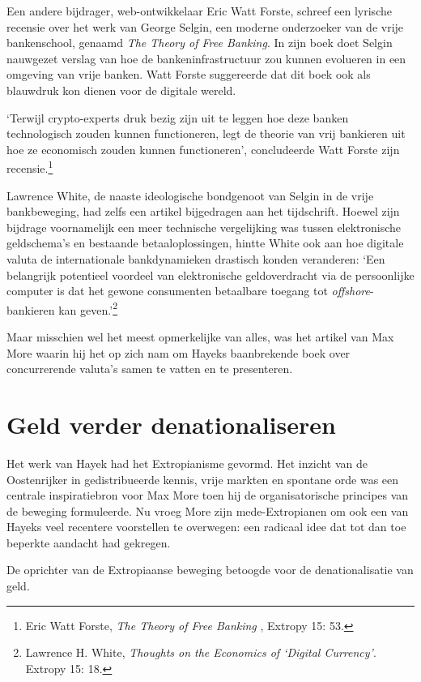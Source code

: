\documentclass[
  a5paper,
  smalldemyvopaper,11pt,twoside,onecolumn,openright,extrafontsizes,
hidelinks]{memoir}
\begin{document}
Een andere bijdrager, web-ontwikkelaar Eric Watt Forste, schreef een
lyrische recensie over het werk van George Selgin, een moderne
onderzoeker van de vrije bankenschool, genaamd \emph{The Theory of Free
Banking}. In zijn boek doet Selgin nauwgezet verslag van hoe de
bankeninfrastructuur zou kunnen evolueren in een omgeving van vrije
banken. Watt Forste suggereerde dat dit boek ook als blauwdruk kon
dienen voor de digitale wereld.

`Terwijl crypto-experts druk bezig zijn uit te leggen hoe deze banken
technologisch zouden kunnen functioneren, legt de theorie van vrij
bankieren uit hoe ze economisch zouden kunnen functioneren',
concludeerde Watt Forste zijn recensie.\footnote{Eric Watt Forste,
  \emph{The Theory of Free Banking }, Extropy 15: 53.}

Lawrence White, de naaste ideologische bondgenoot van Selgin in de vrije
bankbeweging, had zelfs een artikel bijgedragen aan het tijdschrift.
Hoewel zijn bijdrage voornamelijk een meer technische vergelijking was
tussen elektronische geldschema's en bestaande betaaloplossingen, hintte
White ook aan hoe digitale valuta de internationale bankdynamieken
drastisch konden veranderen: `Een belangrijk potentieel voordeel van
elektronische geldoverdracht via de persoonlijke computer is dat het
gewone consumenten betaalbare toegang tot \emph{offshore}-bankieren kan
geven.'\footnote{Lawrence H. White, \emph{Thoughts on the Economics of
  `Digital Currency'}. Extropy 15: 18.}

Maar misschien wel het meest opmerkelijke van alles, was het artikel van
Max More waarin hij het op zich nam om Hayeks baanbrekende boek over
concurrerende valuta's samen te vatten en te presenteren.

\section{Geld verder
denationaliseren}\label{geld-verder-denationaliseren}

Het werk van Hayek had het Extropianisme gevormd. Het inzicht van de
Oostenrijker in gedistribueerde kennis, vrije markten en spontane orde
was een centrale inspiratiebron voor Max More toen hij de
organisatorische principes van de beweging formuleerde. Nu vroeg More
zijn mede-Extropianen om ook een van Hayeks veel recentere voorstellen
te overwegen: een radicaal idee dat tot dan toe beperkte aandacht had
gekregen.

De oprichter van de Extropiaanse beweging betoogde voor de
denationalisatie van geld.
\end{document}
